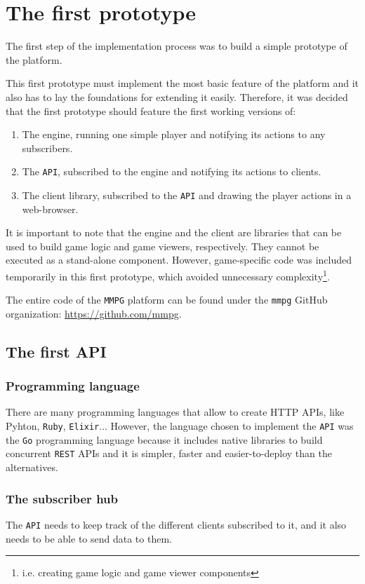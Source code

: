 \documentclass[a4paper,11pt,titlepage,abstract,numbers=noenddot,automark,mnsy,intlimits,rgb,dvipsnames]{report}
\begin{document}
\chapter{The first prototype}
\label{first_prototype}
The first step of the implementation process was to build a simple prototype of the platform.

This first prototype must implement the most basic feature of the platform and it also has to lay the foundations for extending
it easily. Therefore, it was decided that the first prototype should feature the first working versions of:
\begin{enumerate}
\item
The engine, running one simple player and notifying its actions to any subscribers.
\item
The \texttt{API}, subscribed to the engine and notifying its actions to clients.
\item
The client library, subscribed to the \texttt{API} and drawing the player actions in a web-browser.
\end{enumerate}
It is important to note that the engine and the client are libraries that can be used to build
game logic and game viewers, respectively. They cannot be executed as a stand-alone component. However,
game-specific code was included temporarily in this first prototype, which avoided unnecessary complexity\footnote{i.e.
creating game logic and game viewer components}.

The entire code of the \texttt{MMPG} platform can be found under the \texttt{mmpg} GitHub organization: \url{https://github.com/mmpg}.
\section{The first API}
\subsection{Programming language}
There are many programming languages that allow to create HTTP APIs, like Pyhton, \texttt{Ruby}, \texttt{Elixir}... However,
the language chosen to implement the \texttt{API} was the \texttt{Go} programming language because it includes native
libraries to build concurrent \texttt{REST} APIs and it is simpler, faster and easier-to-deploy than the alternatives.
\subsection{The subscriber hub}
The \texttt{API} needs to keep track of the different clients subscribed to it, and it also needs to be able to send data
to them.
\end{document}
